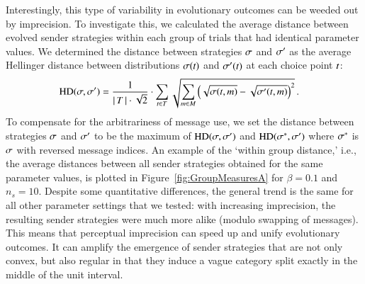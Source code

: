 \documentclass[12pt,english]{article}
\numberwithin{equation}{section}
\begin{document}
Interestingly, this type of variability in evolutionary outcomes can
be weeded out by imprecision. To investigate this, we calculated the average
distance between evolved sender strategies within each group of trials
that had identical parameter values. We determined the distance
between strategies $\sigma$ and $\sigma'$ as the average Hellinger
distance between distributions $\sigma(t)$ and
$\sigma'(t)$ at each choice point $t$:
\begin{align*}
  \text{HD}(\sigma,\sigma') & = \frac{1}{{\left \lvert \, T \, \right\rvert \cdot
     \sqrt{2}}} \cdot  \sum_{t \in T} 
 \sqrt{\sum_{m \in  M}
         \left ( \sqrt{\sigma(t,m)} -
         \sqrt{\sigma'(t,m)} \right )^2 }\,.
\end{align*}
To compensate for the arbitrariness of message use, we set the distance between strategies
$\sigma$ and $\sigma'$ to be the maximum of $\text{HD}(\sigma,\sigma')$ and
$\text{HD}(\sigma^*,\sigma')$ where $\sigma^*$ is $\sigma$ with reversed message
indices. An example of the `within group distance,' i.e., the average distances between
all sender strategies obtained for the same parameter values, is plotted in
Figure~\ref{fig:GroupMeasuresA} for $\beta = 0.1$ and $n_s = 10$. Despite some quantitative
differences, the general trend is the same for all other parameter settings that we tested:
with increasing imprecision, the resulting sender strategies were much more alike (modulo
swapping of messages). This means that perceptual imprecision can speed up and unify
evolutionary outcomes. It can amplify the emergence of sender strategies that are not only
convex, but also regular in that they induce a vague category split exactly in the middle of
the unit interval.
\end{document}
